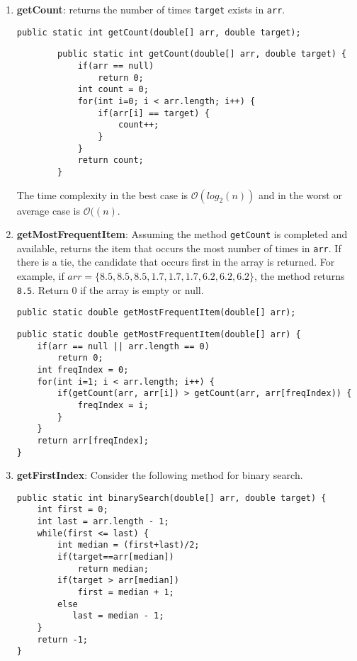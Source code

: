 \begin{questions}
\begin{enumerate}
	\item \textbf{getCount}: returns the number of times \texttt{target} exists in \texttt{arr}.
	
\begin{lstlisting}
public static int getCount(double[] arr, double target);\end{lstlisting}
	
	\ifprintanswers
		\begin{lstlisting}
		public static int getCount(double[] arr, double target) {
			if(arr == null)
				return 0;	
			int count = 0;
			for(int i=0; i < arr.length; i++) {
				if(arr[i] == target) {
					count++;
				}
			}
			return count;
		}
	\end{lstlisting}
	
	The time complexity in the best case is $\mathcal{O}(log_2(n))$ and in the worst or average case is $\mathcal{O}((n)$.
	\else
	\fi
	
	
	\item \textbf{getMostFrequentItem}: Assuming the method \texttt{getCount} is completed and available, returns the item that occurs the most number of times in \texttt{arr}. If there is a tie, the candidate that occurs first in the array is returned. For example, if $arr=\{8.5,8.5,8.5,1.7,1.7,1.7,6.2,6.2,6.2\}$, the method returns \texttt{8.5}. Return 0 if the array is empty or null.
	
\begin{lstlisting}
public static double getMostFrequentItem(double[] arr);		
\end{lstlisting}

	\ifprintanswers
\begin{lstlisting}
public static double getMostFrequentItem(double[] arr) {
	if(arr == null || arr.length == 0)
		return 0;
	int freqIndex = 0;
	for(int i=1; i < arr.length; i++) {
		if(getCount(arr, arr[i]) > getCount(arr, arr[freqIndex)) {
			freqIndex = i;
		}
	}
	return arr[freqIndex];
}	
\end{lstlisting}
	\else
	\fi

	\item \textbf{getFirstIndex}: Consider the following method for binary search.
	
\begin{lstlisting}
public static int binarySearch(double[] arr, double target) {
	int first = 0;
	int last = arr.length - 1;
	while(first <= last) {
   		int median = (first+last)/2;
   		if(target==arr[median])
			return median;
   		if(target > arr[median])
			first = median + 1;
		else
		   last = median - 1;
	}
	return -1;
}	
\end{lstlisting}


\end{enumerate}
\end{questions}
